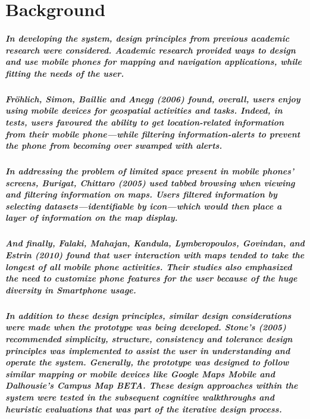 \documentclass{report}
\begin{document}
\chapter{Background}
    \paragraph{In developing the system, design principles from previous
    academic research were considered. Academic research provided ways to design and
    use mobile phones for mapping and navigation applications, while fitting the
    needs of the user.}
    \paragraph{Fröhlich, Simon, Baillie and Anegg (2006) found, overall, users
    enjoy using mobile devices for geospatial activities and tasks. Indeed, in
    tests, users favoured the ability to get location-related information from their
    mobile phone—while filtering information-alerts to prevent the phone from
    becoming over swamped with alerts.}
    \paragraph{In addressing the problem of limited space present in mobile
    phones’ screens, Burigat, Chittaro (2005) used tabbed browsing when viewing and
    filtering information on maps. Users filtered information by selecting
    datasets—identifiable by icon—which would then place a layer of information on
    the map display.}
    \paragraph{And finally, Falaki, Mahajan, Kandula, Lymberopoulos, Govindan,
    and Estrin (2010) found that user interaction with maps tended to take the
    longest of all mobile phone activities. Their studies also emphasized the need
    to customize phone features for the user because of the huge diversity in
    Smartphone usage.}
    \paragraph{In addition to these design principles, similar design
    considerations were made when the prototype was being developed. Stone’s (2005)
    recommended simplicity, structure, consistency and tolerance design principles
    was implemented to assist the user in understanding and operate the system.
    Generally, the prototype was designed to follow similar mapping or mobile
    devices like Google Maps Mobile and Dalhousie’s Campus Map BETA. These design
    approaches within the system were tested in the subsequent cognitive
    walkthroughs and heuristic evaluations that was part of the iterative design
    process.}
\end{document}
